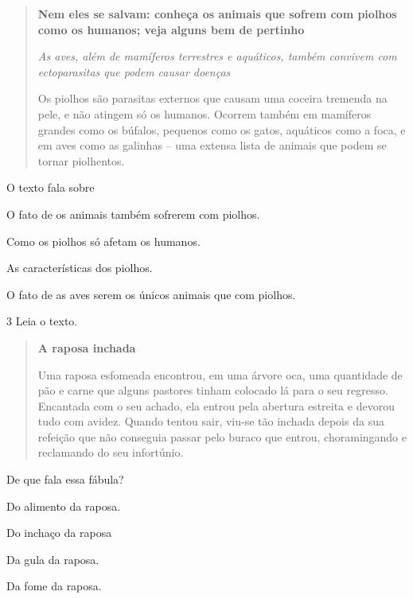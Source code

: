 \begin{quote}
\textbf{Nem eles se salvam: conheça os animais que sofrem com piolhos
como os humanos; veja alguns bem de pertinho}

\textit{As aves, além de mamíferos terrestres e aquáticos, também convivem com
ectoparasitas que podem causar doenças}

Os piolhos são parasitas externos que causam uma coceira tremenda na
pele, e não atingem só os humanos. Ocorrem também em mamíferos grandes
como os búfalos, pequenos como os gatos, aquáticos como a foca, e em
aves como as galinhas -- uma extensa lista de animais que podem se
tornar piolhentos.

\end{quote}

O texto fala sobre

\begin{escolha}
\item O fato de os animais também sofrerem com piolhos.

\item Como os piolhos só afetam os humanos.

\item As características dos piolhos.

\item O fato de as aves serem os únicos animais que com piolhos.
\end{escolha}


\num{3} Leia o texto.

\begin{quote}
\textbf{A raposa inchada}

Uma raposa esfomeada encontrou, em uma árvore oca, uma quantidade de pão e
carne que alguns pastores tinham colocado lá para o seu regresso.
Encantada com o seu achado, ela entrou pela abertura estreita e devorou
tudo com avidez. Quando tentou sair, viu-se tão inchada depois da sua
refeição que não conseguia passar pelo buraco que entrou, choramingando e reclamando do seu infortúnio.

\end{quote}

De que fala essa fábula?

\begin{escolha}
\item Do alimento da raposa.

\item Do inchaço da raposa

\item Da gula da raposa.

\item Da fome da raposa.
\end{escolha}


